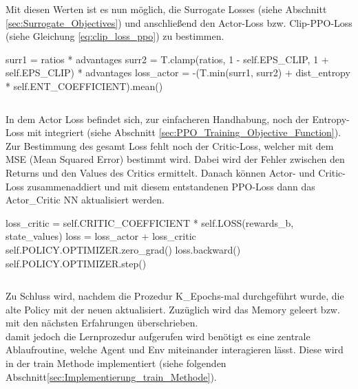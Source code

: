 \begin{lstlisting}[caption=Bestimmung der Ratios und Advantages, label=code:Bestimmung_Ratio_Advantages]
\end{lstlisting}
Mit diesen Werten ist es nun möglich, die Surrogate Losses (siehe Abschnitt \ref{sec:Surrogate_Objectives}) und anschließend den Actor-Loss bzw. Clip-PPO-Loss (siehe Gleichung \ref{eq:clip_loss_ppo}) zu bestimmen.
\begin{python}
surr1 = ratios * advantages
surr2 = T.clamp(ratios, 1 - self.EPS_CLIP, 1 + self.EPS_CLIP) * advantages
loss_actor = -(T.min(surr1, surr2) + dist_entropy * self.ENT_COEFFICIENT).mean()
\end{python}
\begin{lstlisting}[caption=Bestimmung der Surrogate Losses, label=code:Bestimmung_Surrogate_Losses]
\end{lstlisting}
In dem Actor Loss befindet sich, zur einfacheren Handhabung, noch der Entropy-Loss mit integriert (siehe Abschnitt \ref{sec:PPO_Training_Objective_Function}).
Zur Bestimmung des gesamt Loss fehlt noch der Critic-Loss, welcher mit dem MSE (Mean Squared Error) bestimmt wird. Dabei wird der Fehler zwischen den Returns und den Values des Critics ermittelt.
Danach können Actor- und Critic-Loss zusammenaddiert und mit diesem entstandenen PPO-Loss dann das Actor\_Critic NN aktualisiert werden.
\begin{python}
loss_critic = self.CRITIC_COEFFICIENT * self.LOSS(rewards_b, state_values)
loss = loss_actor + loss_critic 
self.POLICY.OPTIMIZER.zero_grad()
loss.backward()
self.POLICY.OPTIMIZER.step()
\end{python}
\begin{lstlisting}[caption=Bestimmung des PPO-Losses \& Update der Netze, label=code:Bestimmung_PPO_Losses_update_NN]
\end{lstlisting}
Zu Schluss wird, nachdem die Prozedur K\_Epochs-mal durchgeführt wurde, die alte Policy mit der neuen aktualisiert. Zuzüglich wird das Memory geleert bzw. mit den nächsten Erfahrungen überschrieben.\\
damit jedoch die Lernprozedur aufgerufen wird benötigt es eine zentrale Ablaufroutine, welche Agent und Env miteinander interagieren lässt. Diese wird in der train Methode implementiert (siehe folgenden Abschnitt\ref{sec:Implementierung_train_Methode}).

